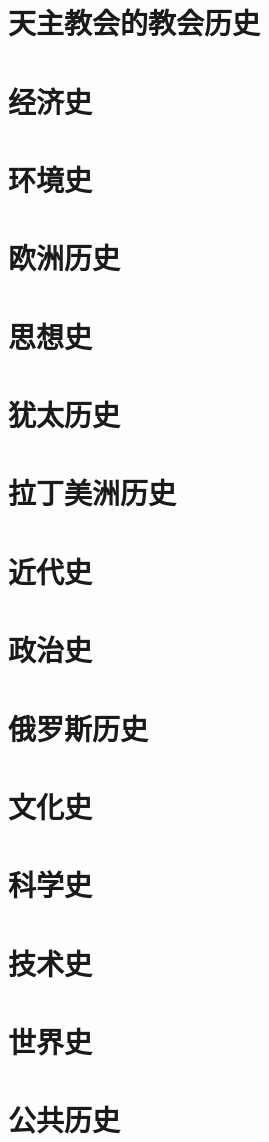 \section{天主教会的教会历史}
\section{经济史}
\section{环境史}
\section{欧洲历史}
\section{思想史}
\section{犹太历史}
\section{拉丁美洲历史}
\section{近代史}
\section{政治史}
\section{俄罗斯历史}
\section{文化史}
\section{科学史}
\section{技术史}
\section{世界史}
\section{公共历史}



